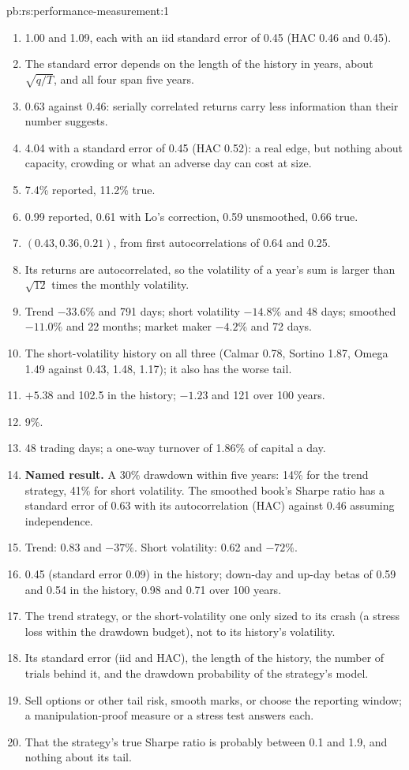 \begin{solution}{pb:rs:performance-measurement:1}
\begin{enumerate}
\item 1.00 and 1.09, each with an iid standard error of 0.45 (HAC 0.46 and 0.45).
\item The standard error depends on the length of the history in years, about $\sqrt{q/T}$, and all four span five years.
\item 0.63 against 0.46: serially correlated returns carry less information than their number suggests.
\item 4.04 with a standard error of 0.45 (HAC 0.52): a real edge, but nothing about capacity, crowding or what an adverse day can cost at size.
\item 7.4\% reported, 11.2\% true.
\item 0.99 reported, 0.61 with Lo's correction, 0.59 unsmoothed, 0.66 true.
\item $(0.43, 0.36, 0.21)$, from first autocorrelations of 0.64 and 0.25.
\item Its returns are autocorrelated, so the volatility of a year's sum is larger than $\sqrt{12}$ times the monthly volatility.
\item Trend $-33.6\%$ and 791 days; short volatility $-14.8\%$ and 48 days; smoothed $-11.0\%$ and 22 months; market maker $-4.2\%$ and 72 days.
\item The short-volatility history on all three (Calmar 0.78, Sortino 1.87, Omega 1.49 against 0.43, 1.48, 1.17); it also has the worse tail.
\item $+5.38$ and 102.5 in the history; $-1.23$ and 121 over 100 years.
\item 9\%.
\item 48 trading days; a one-way turnover of 1.86\% of capital a day.
\item \textbf{Named result.} A 30\% drawdown within five years: 14\% for the trend strategy, 41\% for short volatility. The smoothed book's Sharpe ratio has a
standard error of 0.63 with its autocorrelation (HAC) against 0.46 assuming independence.
\item Trend: 0.83 and $-37\%$. Short volatility: 0.62 and $-72\%$.
\item 0.45 (standard error 0.09) in the history; down-day and up-day betas of 0.59 and 0.54 in the history, 0.98 and 0.71 over 100 years.
\item The trend strategy, or the short-volatility one only sized to its crash (a stress loss within the drawdown budget), not to its history's volatility.
\item Its standard error (iid and HAC), the length of the history, the number of trials behind it, and the drawdown probability of the strategy's model.
\item Sell options or other tail risk, smooth marks, or choose the reporting window; a manipulation-proof measure or a stress test answers each.
\item That the strategy's true Sharpe ratio is probably between 0.1 and 1.9, and nothing about its tail.
\end{enumerate}
\end{solution}

